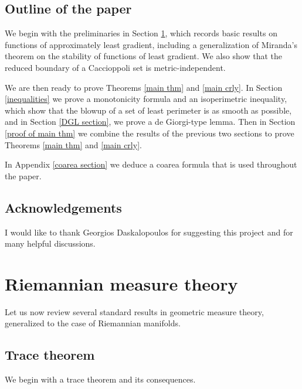 \documentclass[reqno,12pt,letterpaper]{amsart}
\theoremstyle{definition}
\numberwithin{equation}{section}
\begin{document}

\subsection{Outline of the paper}
We begin with the preliminaries in Section \ref{RiemMeasureThy}, which records basic results on functions of approximately least gradient, including a generalization of Miranda's theorem \cite[Teorema 3]{Miranda67} on the stability of functions of least gradient.
We also show that the reduced boundary of a Caccioppoli set is metric-independent.

We are then ready to prove Theorems \ref{main thm} and \ref{main crly}.
In Section \ref{inequalities} we prove a monotonicity formula and an isoperimetric inequality, which show that the blowup of a set of least perimeter is as smooth as possible, and in Section \ref{DGL section}, we prove a de Giorgi-type lemma.
Then in Section \ref{proof of main thm} we combine the results of the previous two sections to prove Theorems \ref{main thm} and \ref{main crly}.

In Appendix \ref{coarea section} we deduce a coarea formula that is used throughout the paper.


\subsection{Acknowledgements}
I would like to thank Georgios Daskalopoulos for suggesting this project and for many helpful discussions.


\section{Riemannian measure theory}\label{RiemMeasureThy}
Let us now review several standard results in geometric measure theory, generalized to the case of Riemannian manifolds.

\subsection{Trace theorem}
We begin with a trace theorem and its consequences.
\end{document}
